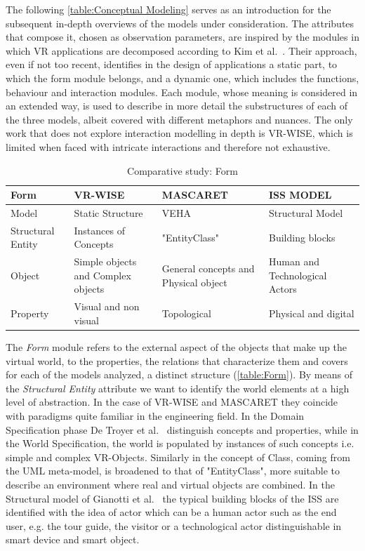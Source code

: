 The following \autoref{table:Conceptual Modeling} serves as an introduction for the subsequent in-depth overviews of the models under consideration. The attributes that compose it, chosen as observation parameters, are inspired by the modules in which VR applications are decomposed according to Kim et al.~\cite{kim_software_1998}. Their approach, even if not too recent, identifies in the design of applications a static part, to which the form module belongs, and a dynamic one, which includes the functions, behaviour and interaction modules. Each module, whose meaning is considered in an extended way, is used to describe in more detail the substructures of each of the three models, albeit covered with different metaphors and nuances. The only work that does not explore interaction modelling in depth is VR-WISE, which is limited when faced with intricate interactions and therefore not exhaustive. 

\begin{table}
\begin{tabular}{|p{2.2cm}|p{3.1cm}|p{3.1cm}|p{3.1cm}|} 
\hline %
\textbf{Form} 
& \textbf{VR-WISE} 
& \textbf{MASCARET}
& \textbf{ISS MODEL} \\ 
\hline
Model
& Static Structure
& VEHA
& Structural Model \\ 
\hline
Structural Entity
& Instances of Concepts
& "EntityClass"
& Building blocks \\ 
\hline
Object
& Simple objects and Complex objects
& General concepts and Physical object
& Human and Technological Actors \\ 
\hline
Property
& Visual and non visual
& Topological 
& Physical and digital \\ 
\hline
\end{tabular} 
\caption{Comparative study: Form}
\label{table:Form}
\end{table}

The \textit{Form} module refers to the external aspect of the objects that make up the virtual world, to the properties, the relations that characterize them and covers for each of the models analyzed, a distinct structure (\autoref{table:Form}). By means of the \textit{Structural Entity} attribute we want to identify the world elements at a high level of abstraction. In the case of VR-WISE and MASCARET they coincide with paradigms quite familiar in the engineering field. 
In the Domain Specification phase De Troyer et al.~\cite{de_troyer_conceptual_2007} distinguish concepts and properties, while in the World Specification, the world is populated by instances of such concepts i.e. simple and complex VR-Objects. Similarly in \cite{chevaillier_semantic_2012} the concept of Class, coming from the UML meta-model, is broadened to that of "EntityClass", more suitable to describe an environment where real and virtual objects are combined. 
In the Structural model of Gianotti et al.~\cite{dobbie_modeling_2020} the typical building blocks of the ISS are identified with the idea of actor which can be a human actor such as the end user, e.g. the tour guide, the visitor or a technological actor distinguishable in smart device and smart object. 

